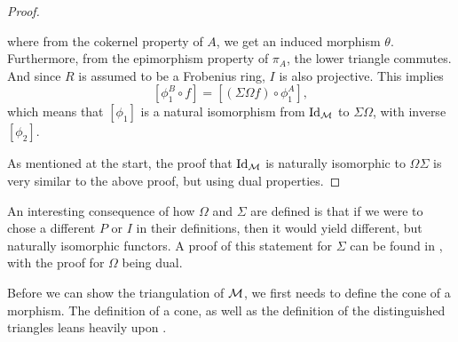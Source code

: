 \begin{proof}
\begin{center}
    \end{center}
    where from the cokernel property of \( A \), we get an induced morphism \( \theta \). Furthermore, from the epimorphism property of \( \pi_A \), the lower triangle commutes. And since \( R \) is assumed to be a Frobenius ring, \( I \) is also projective. This implies
    \[
        [\phi_1^B \circ f] = [(\Sigma \Omega f) \circ \phi_1^A],
    \]
    which means that \( [\phi_1] \) is a natural isomorphism from \( \operatorname{Id}_{{\mathcal{M}}} \) to \( \Sigma \Omega \), with inverse \( [\phi_2] \).

    As mentioned at the start, the proof that \( \operatorname{Id}_{{\mathcal{M}}} \) is naturally isomorphic to \( \Omega \Sigma \) is very similar to the above proof, but using dual properties.
\end{proof}

An interesting consequence of how \( \Omega \) and \( \Sigma \) are defined is that if we were to chose a different \( P \) or \( I \) in their definitions, then it would yield different, but naturally isomorphic functors. A proof of this statement for \( \Sigma \) can be found in \cite[Remark on p. 13]{Happel_1988}, with the proof for \( \Omega \) being dual.

Before we can show the triangulation of \( {\mathcal{M}} \), we first needs to define the cone of a morphism. The definition of a cone, as well as the definition of the distinguished triangles leans heavily upon \cite[Chapter 1, Subsection 2.5]{Happel_1988}.

